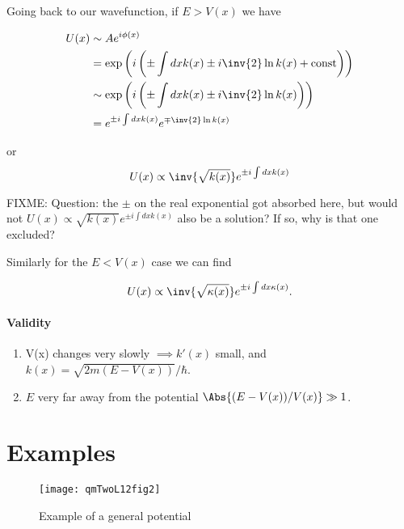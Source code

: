 Going back to our wavefunction, if $E > V(x)$ we have

\begin{align*}
U(x) 
&\sim A e^{i \phi(x)} \\
&= \exp \left(i\left( 
\pm \int dx k(x) \pm i \inv{2} \ln k(x) + \text{const} 
\right)\right) \\
&\sim \exp \left(i\left( 
\pm \int dx k(x) \pm i \inv{2} \ln k(x) 
\right)\right) \\
&= e^{\pm i \int dx k(x)} e^{\mp \inv{2} \ln k(x)} \\
\end{align*}

or
\begin{equation}\label{eqn:qmTwoL12:350}
U(x) \propto \inv{\sqrt{k(x)}} e^{\pm i \int dx k(x)} 
\end{equation}

FIXME: Question: the $\pm$ on the real exponential got absorbed here, but would not $U(x) \propto \sqrt{k(x)} e^{\pm i \int dx k(x)}$ also be a solution?  If so, why is that one excluded?

Similarly for the $E < V(x)$ case we can find

\begin{equation}\label{eqn:qmTwoL12:370}
U(x) \propto \inv{\sqrt{\kappa(x)}} e^{\pm i \int dx \kappa(x)}.
\end{equation}

\paragraph{Validity}
\begin{enumerate}
\item V(x) changes very slowly $\implies k'(x)$ small, and $k(x) = \sqrt{2 m (E - V(x))}/\hbar$.
\item $E$ very far away from the potential $\Abs{(E - V(x))/V(x)} \gg 1$.
\end{enumerate}

\section{Examples}

\begin{figure}[htp]
   \centering
   \texttt{[image: qmTwoL12fig2]}
   \caption{Example of a general potential}\label{fig:qmTwoL13:qmTwoL12fig2}
\end{figure}


